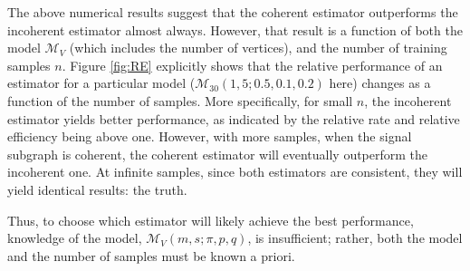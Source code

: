 \documentclass[10pt,journal,cspaper,compsoc]{IEEEtran}
\providecommand{\mc}[1]{\mathcal{#1}}
\begin{document}
The above numerical results suggest that the coherent estimator outperforms the incoherent estimator almost always.  However, that result is a function of both the model $\mc{M}_V$ (which includes the number of vertices), and the number of training samples $n$.  %
Figure \ref{fig:RE} explicitly shows that the relative performance of an estimator for a particular model ($\mc{M}_{30}(1,5;0.5,0.1,0.2)$ here) changes as a function of the number of samples.  More specifically, for small $n$, the incoherent estimator yields better performance, as indicated by the relative rate and relative efficiency being above one.  However, with more samples, when the signal subgraph is coherent, the coherent estimator will eventually outperform the incoherent one.  At infinite samples, since both estimators are consistent, they will yield identical results: the truth.  

Thus, to choose which estimator will likely achieve the best performance, knowledge of the model, $\mc{M}_V(m,s;\pi,p,q)$, is insufficient; rather, both the model and the number of samples must be known a priori.  
\end{document}
